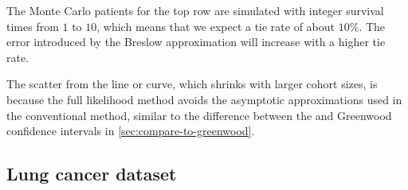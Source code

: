 \documentclass[article]{jss}
\begin{document}
The Monte Carlo patients for the top row are simulated with integer survival times from \(1\) to \(10\), which means that we expect a tie rate of about \(10\%\). The error introduced by the Breslow approximation will increase with a higher tie rate.

The scatter from the line or curve, which shrinks with larger cohort sizes, is because the full likelihood method avoids the asymptotic approximations used in the conventional method, similar to the difference between the  and Greenwood confidence intervals in \cref{sec:compare-to-greenwood}.

\subsection{Lung cancer dataset}
\end{document}

